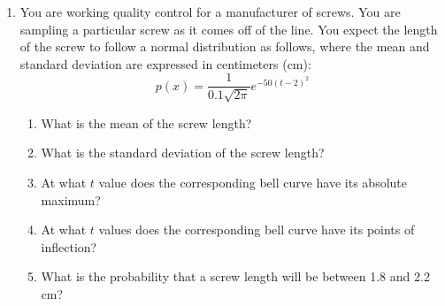 \documentclass[letterpaper,12pt,fleqn]{article}
\begin{document}
\begin{enumerate}[left=0pt]
\item You are working quality control for a manufacturer of screws.  You are sampling a particular screw as it comes off of
  the line.  You expect the length of the screw to follow a normal distribution as follows, where the mean and standard
  deviation are expressed in centimeters (cm):
  \[p(x)=\frac{1}{0.1\sqrt{2\pi}}e^{-50(t-2)^2}\]
  \begin{enumerate}
  \item What is the mean of the screw length?
  \item What is the standard deviation of the screw length?
  \item At what \(t\) value does the corresponding bell curve have its absolute maximum?
  \item At what \(t\) values does the corresponding bell curve have its points of inflection?
  \item What is the probability that a screw length will be between 1.8 and 2.2 cm?
  \end{enumerate}

\end{enumerate}
\end{document}
